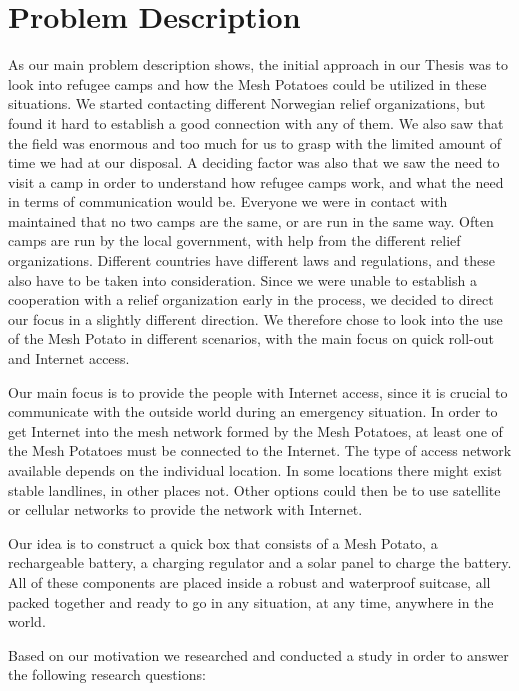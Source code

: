\section{Problem Description}
As our main problem description shows, the initial approach in our Thesis was to look into refugee camps and how the Mesh Potatoes could be utilized in these situations. We started contacting different Norwegian relief organizations, but found it hard to establish a good connection with any of them. We also saw that the field was enormous and too much for us to grasp with the limited amount of time we had at our disposal. A deciding factor was also that we saw the need to visit a camp in order to understand how refugee camps work, and what the need in terms of communication would be. Everyone we were in contact with maintained that no two camps are the same, or are run in the same way. Often camps are run by the local government, with help from the different relief organizations. Different countries have different laws and regulations, and these also have to be taken into consideration. Since we were unable to establish a cooperation with a relief organization early in the process, we decided to direct our focus in a slightly different direction. We therefore chose to look into the use of the Mesh Potato in different scenarios, with the main focus on quick roll-out and Internet access.

Our main focus is to provide the people with Internet access, since it is crucial to communicate with the outside world during an emergency situation. In order to get Internet into the mesh network formed by the Mesh Potatoes, at least one of the Mesh Potatoes must be connected to the Internet. The type of access network available depends on the individual location. In some locations there might exist stable landlines, in other places not. Other options could then be to use satellite or cellular networks to provide the network with Internet.  

Our idea is to construct a \gls{quick} box that consists of a Mesh Potato, a rechargeable battery, a charging regulator and a solar panel to charge the battery. All of these components are placed inside a robust and waterproof suitcase, all packed together and ready to go in any situation, at any time, anywhere in the world. 

Based on our motivation we researched and conducted a study in order to answer the following research questions: 


